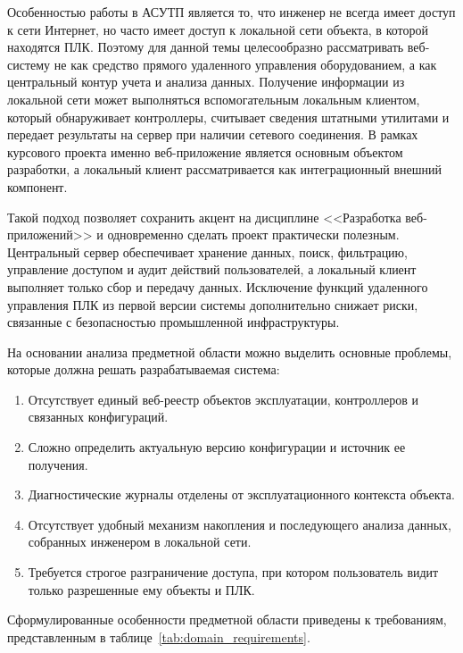 Особенностью работы в АСУТП является то, что инженер не всегда имеет доступ к
сети Интернет, но часто имеет доступ к локальной сети объекта, в которой
находятся ПЛК. Поэтому для данной темы целесообразно рассматривать веб-систему
не как средство прямого удаленного управления оборудованием, а как центральный
контур учета и анализа данных. Получение информации из локальной сети может
выполняться вспомогательным локальным клиентом, который обнаруживает
контроллеры, считывает сведения штатными утилитами и передает результаты на
сервер при наличии сетевого соединения. В рамках курсового проекта именно
веб-приложение является основным объектом разработки, а локальный клиент
рассматривается как интеграционный внешний компонент.

Такой подход позволяет сохранить акцент на дисциплине <<Разработка
веб-приложений>> и одновременно сделать проект практически полезным. Центральный
сервер обеспечивает хранение данных, поиск, фильтрацию, управление доступом и
аудит действий пользователей, а локальный клиент выполняет только сбор и
передачу данных. Исключение функций удаленного управления ПЛК из первой версии
системы дополнительно снижает риски, связанные с безопасностью промышленной
инфраструктуры.

На основании анализа предметной области можно выделить основные проблемы,
которые должна решать разрабатываемая система:
\begin{enumerate}
    \item Отсутствует единый веб-реестр объектов эксплуатации, контроллеров и связанных конфигураций.
    \item Сложно определить актуальную версию конфигурации и источник ее получения.
    \item Диагностические журналы отделены от эксплуатационного контекста объекта.
    \item Отсутствует удобный механизм накопления и последующего анализа данных, собранных инженером в локальной сети.
    \item Требуется строгое разграничение доступа, при котором пользователь видит только разрешенные ему объекты и ПЛК.
\end{enumerate}

Сформулированные особенности предметной области приведены к требованиям,
представленным в таблице~\ref{tab:domain_requirements}.

